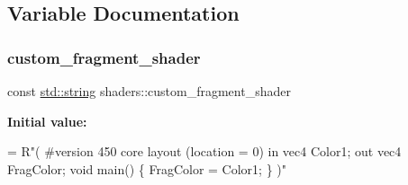 \subsection{Variable Documentation}
\mbox{\label{namespaceshaders_acea5f97c6eee2604b26ca2c01a42018b}} 
\subsubsection{\texorpdfstring{custom\+\_\+fragment\+\_\+shader}{custom\_fragment\_shader}}
{\footnotesize\ttfamily const \mbox{\hyperlink{glad_8h_ac83513893df92266f79a515488701770}{std\+::string}} shaders\+::custom\+\_\+fragment\+\_\+shader\hspace{0.3cm}{\ttfamily [static]}}

{\bfseries Initial value\+:}
\begin{DoxyCode}
= R\textcolor{stringliteral}{"(}
\textcolor{stringliteral}{#version 450 core}
\textcolor{stringliteral}{}
\textcolor{stringliteral}{layout (location = 0) in  vec4 Color1;}
\textcolor{stringliteral}{}
\textcolor{stringliteral}{out vec4 FragColor;}
\textcolor{stringliteral}{}
\textcolor{stringliteral}{void main()}
\textcolor{stringliteral}{\{}
\textcolor{stringliteral}{FragColor = Color1;}
\textcolor{stringliteral}{\}}
\textcolor{stringliteral}{)"}
\end{DoxyCode}
